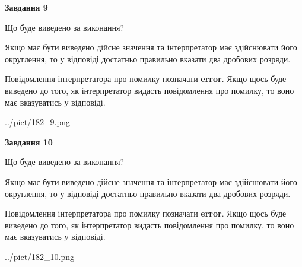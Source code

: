 \documentclass[12pt, ukrainian]{article}
\begin{document}
{\begin {Large}
{\begin {center}\textbf{Завдання 9}\end {center}}\par
Що буде виведено за виконання? \par

Якщо має бути виведено дійсне значення та інтерпретатор має здійснювати його округлення, 
то у відповіді достатньо правильно вказати два дробових розряди.

Повідомлення інтерпретатора про помилку позначати \textbf{error}.
Якщо щось буде виведено до того, як інтерпретатор видасть повідомлення про помилку, 
то воно має вказуватись у відповіді. \par

\begin{center}
	{../pict/182_9.png}
\end{center}
\newpage

{\begin {center}\textbf{Завдання 10}\end {center}}\par
Що буде виведено за виконання? \par

Якщо має бути виведено дійсне значення та інтерпретатор має здійснювати його округлення, 
то у відповіді достатньо правильно вказати два дробових розряди.

Повідомлення інтерпретатора про помилку позначати \textbf{error}.
Якщо щось буде виведено до того, як інтерпретатор видасть повідомлення про помилку, 
то воно має вказуватись у відповіді. \par

\begin{center}
	{../pict/182_10.png}
\end{center}
\newpage

\end {Large}}
\end{document}
